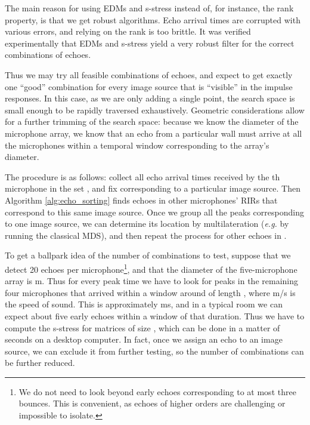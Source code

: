 \documentclass[10pt,double]{IEEEtran}
\newcommand{\rev}[1]{{#1}}
\begin{document}
The main reason for using EDMs and s-stress instead of, for instance, the rank
property, is that we get robust algorithms. Echo arrival times are corrupted
with various errors, and relying on the rank is too brittle. It was verified
experimentally \cite{Dokmanic:2013dz} that EDMs and s-stress yield a very
robust filter for the correct combinations of echoes.

Thus we may try all feasible combinations of echoes, and expect to get exactly
one ``good'' combination for every image source that is ``visible'' in the
impulse responses. In this case, as we are only adding a single point, the
search space is small enough to be rapidly traversed exhaustively. Geometric
considerations allow for a further trimming of the search space: \rev{because we
know the diameter of the microphone array, we know that an echo from a
particular wall must arrive at all the microphones within a temporal window
corresponding to the array's diameter.}

The procedure is as follows: collect all echo arrival times received by the
th microphone in the set , and fix  corresponding to a
particular image source. Then Algorithm \ref{alg:echo_sorting} finds echoes in
other microphones' RIRs that correspond to this same image source. Once we
group all the peaks corresponding to one image source, we can determine its
location by multilateration (\emph{e.g.} by running the classical MDS), and
then repeat the process for other echoes in .

\rev{To get a ballpark idea of the number of combinations to test, suppose that we
detect 20 echoes per microphone\footnote{\rev{We do not need to look beyond
early echoes corresponding to at most three bounces. This is convenient, as
echoes of higher orders are challenging or impossible to isolate.}}, and that the
diameter of the five-microphone array is  m. Thus for every peak time
 we have to look for peaks in the remaining four microphones that arrived
within a window around  of length , where  m/s is the
speed of sound. This is approximately  ms, and in a typical room we can
expect about five early echoes within a window of that duration. Thus we have
to compute the s-stress for  matrices of size , which can be done in a matter of seconds on a desktop computer. In fact,
once we assign an echo to an image source, we can exclude it from further
testing, so the number of combinations can be further reduced.}
\end{document}

